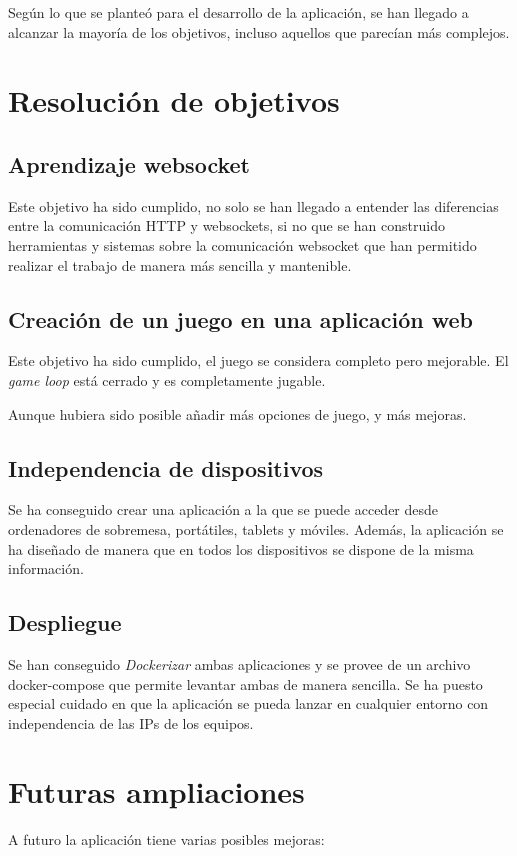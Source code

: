 Según lo que se planteó para el desarrollo de la aplicación, se han llegado a alcanzar la mayoría de los objetivos, incluso aquellos que parecían más complejos.

\section{Resolución de objetivos}

\subsection{Aprendizaje websocket}
Este objetivo ha sido cumplido, no solo se han llegado a entender las diferencias entre la comunicación HTTP y websockets, si no que se han construido herramientas y sistemas sobre la comunicación websocket que han permitido realizar el trabajo de manera más sencilla y mantenible.

\subsection{Creación de un juego en una aplicación web}
Este objetivo ha sido cumplido, el juego se considera completo pero mejorable. El \textit{game loop} está cerrado y es completamente jugable.

Aunque hubiera sido posible añadir más opciones de juego, y más mejoras.

\subsection{Independencia de dispositivos}
Se ha conseguido crear una aplicación a la que se puede acceder desde ordenadores de sobremesa, portátiles, tablets y móviles. Además, la aplicación se ha diseñado de manera que en todos los dispositivos se dispone de la misma información.

\subsection{Despliegue}
Se han conseguido \textit{Dockerizar} ambas aplicaciones y se provee de un archivo docker-compose que permite levantar ambas de manera sencilla. Se ha puesto especial cuidado en que la aplicación se pueda lanzar en cualquier entorno con independencia de las IPs de los equipos.

\section{Futuras ampliaciones}
A futuro la aplicación tiene varias posibles mejoras:

